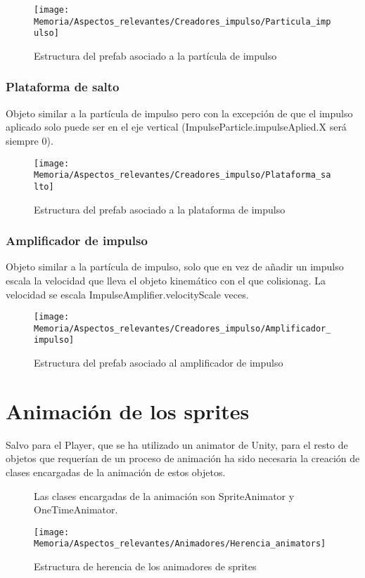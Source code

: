 \begin{figure}[h]
\texttt{[image: Memoria/Aspectos\_relevantes/Creadores\_impulso/Particula\_impulso]}
\caption{Estructura del prefab asociado a la partícula de impulso}
\end{figure}

\subsubsection{Plataforma de salto}
Objeto similar a la partícula de impulso pero con la excepción de que el impulso aplicado solo puede ser en el eje vertical (ImpulseParticle.impulseAplied.X será siempre 0).

\begin{figure}[h]
\texttt{[image: Memoria/Aspectos\_relevantes/Creadores\_impulso/Plataforma\_salto]}
\caption{Estructura del prefab asociado a la plataforma de impulso}
\end{figure}

\subsubsection{Amplificador de impulso}
Objeto similar a la partícula de impulso, solo que en vez de añadir un impulso escala la velocidad que lleva el objeto kinemático con el que colisionag. La velocidad se escala ImpulseAmplifier.velocityScale veces.

\begin{figure}[h]
\texttt{[image: Memoria/Aspectos\_relevantes/Creadores\_impulso/Amplificador\_impulso]}
\caption{Estructura del prefab asociado al amplificador de impulso}
\end{figure}

\section{Animación de los sprites}
Salvo para el Player, que se ha utilizado un animator de Unity, para el resto de objetos que requerían de un proceso de animación ha sido necesaria la creación de clases encargadas de la animación de estos objetos.\\

\begin{figure}[h]
Las clases encargadas de la animación son SpriteAnimator y OneTimeAnimator.

\texttt{[image: Memoria/Aspectos\_relevantes/Animadores/Herencia\_animators]}
\caption{Estructura de herencia de los animadores de sprites}
\end{figure}

